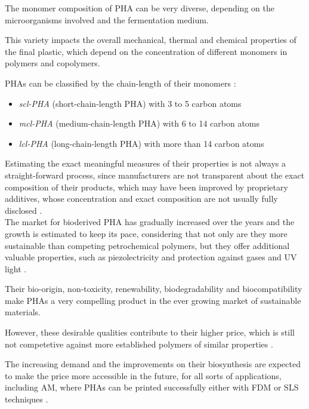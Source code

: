 \documentclass{article}
\begin{document}
    The monomer composition of PHA can be very diverse, depending on the microorganisms involved and the fermentation medium. 
    
    This variety impacts the overall mechanical, thermal and chemical properties of the final plastic, which depend on the concentration of 
    different monomers in polymers and copolymers. 

    PHAs can be classified by the chain-length of their monomers \autocite*{Messori_Bondioli_PHAs}: 

    \begin{itemize}
        \item \textit{scl-PHA} (short-chain-length PHA) with 3 to 5 carbon atoms
        \item \textit{mcl-PHA} (medium-chain-length PHA) with 6 to 14 carbon atoms
        \item \textit{lcl-PHA} (long-chain-length PHA) with more than 14 carbon atoms
    \end{itemize}


    Estimating the exact meaningful measures of their properties is not always a straight-forward process, 
    since manufacturers are not transparent about the exact composition of their products, which may have been 
    improved by proprietary additives, whose concentration and exact composition are not usually fully disclosed \autocite{Kovalcik_PHA_Review}. \\ 
    
    The market for bioderived PHA has gradually increased over the years and the growth is estimated to keep its pace, considering that not only are they more sustainable
    than competing petrochemical polymers, but they offer additional valuable properties, such as piezolectricity 
    and protection against gases and UV light \autocite{Kovalcik_PHA_Review}.

    Their bio-origin, non-toxicity, renewability, biodegradability and biocompatibility make PHAs a very compelling product in the 
    ever growing market of sustainable materials. 

    However, these desirable qualities contribute to their higher price, which is still not competetive against more established 
    polymers of similar properties \autocite{Kovalcik_PHA_Review}. 

    The increasing demand and the improvements on their biosynthesis are expected to make the price more accessible in the future, for all sorts of 
    applications, including AM, where PHAs can be printed successfully either with FDM or SLS techniques \autocites{Kovalcik_PHA_Review}. 
    
\end{document}
